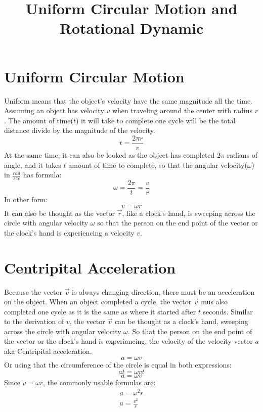 \documentclass[]{article}
\title{Uniform Circular Motion and Rotational Dynamic}
\author{}
\begin{document}
    \maketitle
    \section{Uniform Circular Motion}\label{sec:uniform-circular-motion}
        Uniform means that the object's velocity have the same magnitude all
        the time. Assuming an object has velocity $v$ when traveling around
        the center with radius $r$. The amount of time($t$) it will take to
        complete one cycle will be the total distance divide by the magnitude of
        the velocity.
            \[t = \frac{2\pi r}{v} \]
        At the same time, it can also be looked as the object has completed $2\pi$ radians of angle,
        and it takes $t$ amount of time to complete, so that the angular
        velocity($\omega$) in $\frac{rad}{sec}$ has formula:
            \[\omega = \frac{2\pi}{t} = \frac{v}{r}\]
        In other form:
            \[v = \omega r\]
        It can also be thought as the vector $\vec{r}$, like a clock's hand, is
        sweeping across the circle with angular velocity $\omega$ so that the
        person on the end point of the vector or the clock's hand is
        experiencing a velocity $v$.
    \section{Centripital Acceleration}\label{sec:centripital-acceleration}
        Because the vector $\vec{v}$ is always changing direction, there
    must be an acceleration on the object. When an object completed a cycle,
    the vector $\vec{v}$ mus also completed one cycle as it is the same as
    where it started after $t$ seconds. Similar to the derivation of $v$, the
    vector $\vec{v}$ can be thought as a clock's hand, sweeping across the circle with
    angular velocity $\omega$. So that the person on the end point of the
    vector or the clock's hand is experiancing, the velocity of the velocity
    vector $a$ aka Centripital acceleration.
    \[a = \omega v\]
    Or using that the circumference of the circle is equal in both expressions:
    \[a t  = \omega v t\]
    \[a = \omega v\]
    Since $v = \omega r $, the commonly usable formulas are:
        \begin{gather*}
            a = \omega ^2 r\\
            a = \frac{v^2}{r}\\
        \end{gather*}
\end{document}
